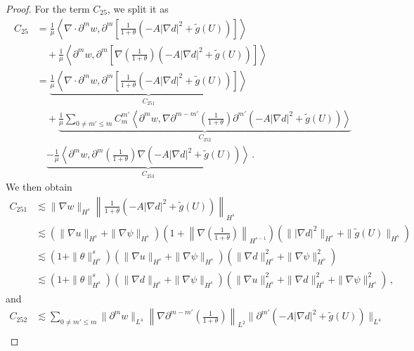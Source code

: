 \documentclass[10pt,a4paper]{amsart}
\begin{document}
\begin{proof}
For the term $C_{25}$, we split it as
\begin{align*}
C_{25} & = \frac{1}{\mu} \left\langle \nabla \cdot \partial^m w, \partial^m \left[ \frac{1}{1+\theta} (-A | \nabla d |^2 + \tilde{g}(U)) \right] \right\rangle \\
&\quad + \frac{1}{\mu} \left\langle \partial^m w, \partial^m \left[ \nabla \left(\frac{1}{1+\theta}\right) (-A | \nabla d |^2 + \tilde{g}(U)) \right] \right\rangle \\
&= \underset{C_{251}}{\underbrace{\frac{1}{\mu} \left\langle \nabla \cdot \partial^m w, \partial^m \left[ \frac{1}{1+\theta} (-A | \nabla d |^2 + \tilde{g}(U)) \right] \right\rangle}} \\
&\quad +\underset{C_{252}}{\underbrace{ \frac{1}{\mu} \sum_{0 \neq m' \leq m} C_m^{m'} \left\langle \partial^m w, \nabla \partial^{m-m'} \left(\frac{1}{1+\theta}\right) \partial^{m'} (-A | \nabla d |^2 + \tilde{g}(U)) \right\rangle}}{} \\
&\quad \underset{C_{253}}{\underbrace{- \frac{1}{\mu} \left\langle \partial^m w, \partial^m \left(\frac{1}{1+\theta}\right) \nabla (-A | \nabla d |^2 + \tilde{g}(U)) \right\rangle}} \,.
\end{align*}
We then obtain 
\begin{equation*}
\begin{aligned}
C_{251}&\lesssim\| \nabla w \|_{H^s} \left\| \frac{1}{1+\theta} (-A | \nabla d |^2 + \tilde{g}(U)) \right\|_{H^s} \\&
\lesssim ( \| \nabla u \|_{H^s} + \| \nabla \psi \|_{H^s} ) ( 1 + \left\| \nabla \left(\frac{1}{1+\theta}\right) \right\|_{H^{s-1}} ) ( \| |\nabla d|^2 \|_{H^s} + \| \tilde{g}(U) \|_{H^s} ) \\&
\lesssim( 1 + \| \theta \|_{H^s}^s ) ( \| \nabla u \|_{H^s} + \| \nabla \psi \|_{H^s} ) ( \| \nabla d \|_{H^s}^2 + \| \nabla \psi \|_{H^s}^2 ) \\&
\lesssim ( 1 + \| \theta \|_{H^s}^s ) ( \| \nabla d \|_{H^s} + \| \nabla \psi \|_{H^s} ) ( \| \nabla u \|_{H^s}^2 + \| \nabla d \|_{H^s}^2 + \| \nabla \psi \|_{H^s}^2 )
\,,
\end{aligned}
\end{equation*}
and
\begin{equation*}
\begin{aligned}
C_{252}&\lesssim\sum_{0\neq m' \leq m} \| \partial^m w \|_{L^4} \left\| \nabla \partial^{m-m'} \left(\frac{1}{1+\theta}\right) \right\|_{L^2} \| \partial^{m'} (-A | \nabla d |^2 + \tilde{g}(U)) \|_{L^4} \\

\end{aligned}
\end{equation*}
\end{proof}
\end{document}
